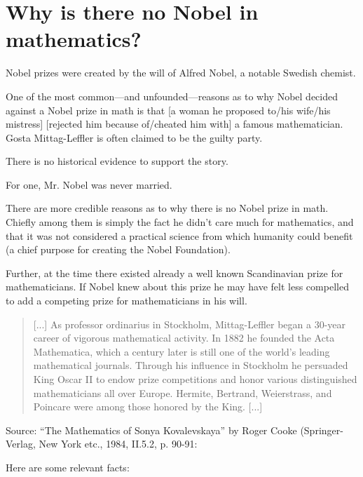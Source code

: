\section{Why is there no Nobel in mathematics?}

    Nobel prizes were created by the will of Alfred Nobel, a notable
    Swedish chemist.

    One of the most common---and unfounded---reasons as to why Nobel
    decided against a Nobel prize in math is that [a woman he proposed
    to/his wife/his mistress] [rejected him because of/cheated him
    with] a famous mathematician. Gosta Mittag-Leffler is often claimed
    to be the guilty party.

    There is no historical evidence to support the story.

    For one, Mr. Nobel was never married.

    There are more credible reasons as to why there is no Nobel prize
    in math. Chiefly among them is simply the fact he didn't care much
    for mathematics, and that it was not considered a practical
    science from which humanity could benefit (a chief purpose
    for creating the Nobel Foundation).

    Further, at the time there existed already a well known
    Scandinavian prize for mathematicians. If Nobel knew about
    this prize he may have felt less compelled to add a competing
    prize for mathematicians in his will.

    \begin{quote}
[...] As professor ordinarius in Stockholm, Mittag-Leffler began a 30-year
career of vigorous mathematical activity. In 1882 he founded the Acta
Mathematica, which a century later is still one of the world's leading
mathematical journals. Through his influence in Stockholm he persuaded
King Oscar II to endow prize competitions and honor various distinguished
mathematicians all over Europe. Hermite, Bertrand, Weierstrass, and
Poincare were among those honored by the King. [...]
\end{quote}
Source: ``The Mathematics of Sonya Kovalevskaya'' by Roger
Cooke (Springer-Verlag, New York etc., 1984, II.5.2, p. 90-91:


    Here are some relevant facts:

